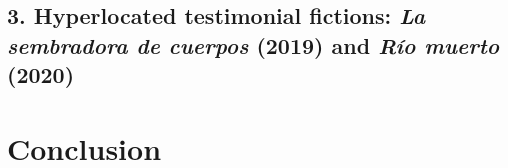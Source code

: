 \documentclass[
  11pt,
,
onecolumn,
openany
]{book}
\begin{document}
\hypertarget{hyperlocated-testimonial-fictions-la-sembradora-de-cuerpos-2019-and-ruxedo-muerto-2020}{%
\subsection{\texorpdfstring{3. Hyperlocated testimonial fictions: \emph{La
sembradora de cuerpos} (2019) and \emph{Río muerto}
(2020)}{3. Hyperlocated testimonial fictions: La sembradora de cuerpos (2019) and Río muerto (2020)}}\label{hyperlocated-testimonial-fictions-la-sembradora-de-cuerpos-2019-and-ruxedo-muerto-2020}}

\hypertarget{conclusion}{%
\section{\texorpdfstring{\textbf{Conclusion}}{Conclusion}}\label{conclusion}}
\end{document}
